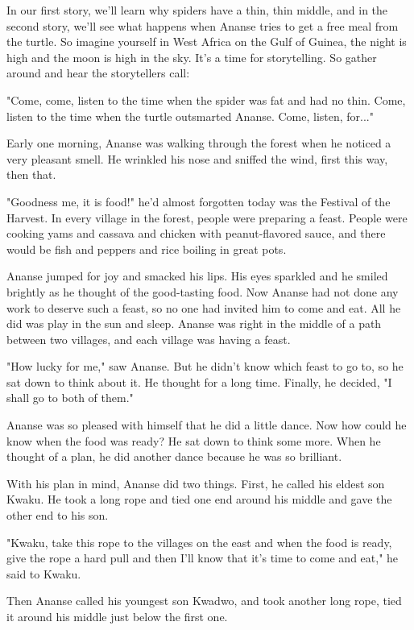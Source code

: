 In our first story, we'll learn why spiders have a thin, thin middle, and in the second story, we'll see what happens when Ananse tries to get a free meal from the turtle. So imagine yourself in West Africa on the Gulf of Guinea, the night is high and the moon is high in the sky. It's a time for storytelling. So gather around and hear the storytellers call:

"Come, come, listen to the time when the spider was fat and had no thin. Come, listen to the time when the turtle outsmarted Ananse. Come, listen, for..."

Early one morning, Ananse was walking through the forest when he noticed a very pleasant smell. He wrinkled his nose and sniffed the wind, first this way, then that.

"Goodness me, it is food!" he'd almost forgotten today was the Festival of the Harvest. In every village in the forest, people were preparing a feast. People were cooking yams and cassava and chicken with peanut-flavored sauce, and there would be fish and peppers and rice boiling in great pots.

Ananse jumped for joy and smacked his lips. His eyes sparkled and he smiled brightly as he thought of the good-tasting food. Now Ananse had not done any work to deserve such a feast, so no one had invited him to come and eat. All he did was play in the sun and sleep. Ananse was right in the middle of a path between two villages, and each village was having a feast.

"How lucky for me," saw Ananse. But he didn't know which feast to go to, so he sat down to think about it. He thought for a long time. Finally, he decided, "I shall go to both of them."

Ananse was so pleased with himself that he did a little dance. Now how could he know when the food was ready? He sat down to think some more. When he thought of a plan, he did another dance because he was so brilliant.

With his plan in mind, Ananse did two things. First, he called his eldest son Kwaku. He took a long rope and tied one end around his middle and gave the other end to his son.

"Kwaku, take this rope to the villages on the east and when the food is ready, give the rope a hard pull and then I'll know that it's time to come and eat," he said to Kwaku.

Then Ananse called his youngest son Kwadwo, and took another long rope, tied it around his middle just below the first one.


